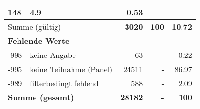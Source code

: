 \begin{longtable}{lXrrr}
       \num{148} &
       \num[round-mode=places,round-precision=2]{4.9} &
         \num[round-mode=places,round-precision=2]{0.53} \\
     \midrule
     \multicolumn{2}{l}{Summe (gültig)} &
       \textbf{\num{3020}} &
     \textbf{100} &
       \textbf{\num[round-mode=places,round-precision=2]{10.72}} \\
     \multicolumn{5}{l}{\textbf{Fehlende Werte}}\\
       -998 &
       keine Angabe &
         \num{63} &
        - &
         \num[round-mode=places,round-precision=2]{0.22} \\
       -995 &
       keine Teilnahme (Panel) &
         \num{24511} &
        - &
         \num[round-mode=places,round-precision=2]{86.97} \\
       -989 &
       filterbedingt fehlend &
         \num{588} &
        - &
         \num[round-mode=places,round-precision=2]{2.09} \\
     \midrule
     \multicolumn{2}{l}{\textbf{Summe (gesamt)}} &
          \textbf{\num{28182}} &
        \textbf{-} &
        \textbf{100} \\
     \bottomrule
     \end{longtable}
     
